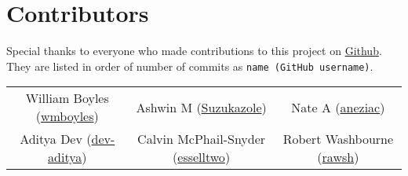 \section{Contributors}
Special thanks to everyone who made contributions to this project on \href{https://github.com/wmboyles/Math-Summaries}{Github}.
They are listed in order of number of commits as \texttt{name (GitHub username)}.

\begin{center}
    \begin{tabular}{ c c c }
    	William Boyles (\href{https://api.github.com/users/wmboyles}{wmboyles}) & Ashwin M  (\href{https://api.github.com/users/Suzukazole}{Suzukazole}) & Nate A (\href{https://api.github.com/users/aneziac}{aneziac}) \\
		Aditya Dev (\href{https://api.github.com/users/dev-aditya}{dev-aditya}) & Calvin McPhail-Snyder (\href{https://api.github.com/users/esselltwo}{esselltwo}) & Robert Washbourne (\href{https://api.github.com/users/rawsh}{rawsh}) \\
	\end{tabular}
\end{center}
